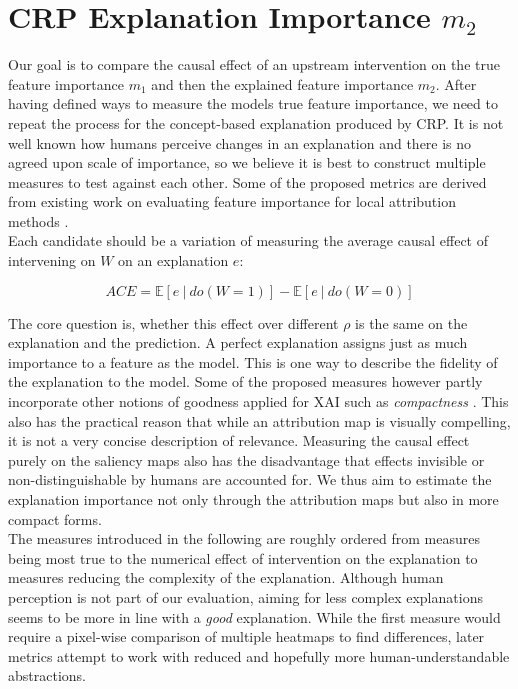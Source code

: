 
\section{CRP Explanation Importance $m_2$}\label{section:measure}
Our goal is to compare the causal effect of an upstream intervention on the true feature importance $m_1$ and then the explained feature importance $m_2$. After having defined ways to measure the models true feature importance, we need to repeat the process for the concept-based explanation produced by CRP. It is not well known how humans perceive changes in an explanation and there is no agreed upon scale of importance, so we believe it is best to construct multiple measures to test against each other. Some of the proposed metrics are derived from existing work on evaluating feature importance for local attribution methods \cite{Sixt2020, Karimi2023, Arras2022}.\\

Each candidate should be a variation of measuring the average causal effect of intervening on $W$ on an explanation $e$:
\begin{center}
\begin{equation}
\displaystyle ACE = \mathbb{E} [e \ | \ do(W=1) ] - \mathbb{E} [ e \ | \ do(W=0) ]
\end{equation}
\end{center}

The core question is, whether this effect over different $\rho$ is the same on the explanation and the prediction. A perfect explanation assigns just as much importance to a feature as the model. This is one way to describe the fidelity of the explanation to the model. Some of the proposed measures however partly incorporate other notions of goodness applied for XAI such as \textit{compactness} \cite{Nauta2023}. This also has the practical reason that while an attribution map is visually compelling, it is not a very concise description of relevance. Measuring the causal effect purely on the saliency maps also has the disadvantage that effects invisible or non-distinguishable by humans are accounted for. 
We thus aim to estimate the explanation importance not only through the attribution maps but also in more compact forms. \\

The measures introduced in the following are roughly ordered from measures being most true to the numerical effect of intervention on the explanation to measures reducing the complexity of the explanation. Although human perception is not part of our evaluation, aiming for less complex explanations seems to be more in line with a \textit{good} explanation. While the first measure would require a pixel-wise comparison of multiple heatmaps to find differences, later metrics attempt to work with reduced and hopefully more human-understandable abstractions. \\

